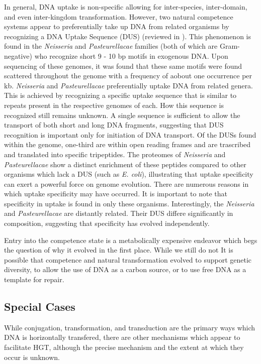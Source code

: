 In general, DNA uptake is non-specific allowing for inter-species, inter-domain,
and even inter-kingdom transformation. However, two natural competence systems
appear to preferentially take up DNA from related organisms by recognizing a DNA
Uptake Sequence (DUS) (reviewed in \citet{Mell:2014dj}). This phenomenon is
found in the \textit{Neisseria} and \textit{Pasteurellacae} families (both of
which are Gram-negative) who recognize short 9 - 10 bp motifs in exogenous DNA.
Upon sequencing of these genomes, it was found that these same motifs were found
scattered throughout the genome with a frequency of aobout one occurrence per
kb.  \textit{Neisseria} and \textit{Pasteurellacae} preferentially uptake DNA
from related genera. This is achieved by recognizing a specific uptake sequence
that is similar to repeats present in the respective genomes of each. How this
sequence is recognized still remains unknown. A single sequence is sufficient to
allow the transport of both short and long DNA fragments, suggesting that DUS
recognition is important only for initiation of DNA transport. Of the DUSs found
within the genome, one-third are within open reading frames and are trascribed
and translated into specific tripeptides. The proteomes of \textit{Neisseria}
and \textit{Pasteurellacae} show a distinct enrichment of these peptides
compared to other organisms which lack a DUS (such as \textit{E. coli}),
illustrating that uptake specificity can exert a powerful force on genome
evolution. There are numerous reasons in which uptake specificity may have
occurred. It is important to note that specificity in uptake is found in only
these organisms. Interestingly, the \textit{Neisseria} and
\textit{Pasteurellacae} are distantly related. Their DUS differe significantly
in composition, suggesting that specificity has evolved independently.


Entry into the competence state is a metabolically expensive endeavor which begs
the question of why it evolved in the first place. While we still do not 
It is possible that competence and natural transformation evolved to support
genetic diversity\cite{Barton:1998uq, Otto:2006vm}, to allow the use of DNA as a
carbon source\cite{Dubnau:199vq, Redfield:2001vx}, or to use free DNA as a
template for repair\cite{Claverys:2006do, Dorer:2010tf}.
\subsection*{Special Cases}
While conjugation, transformation, and transduction are the primary ways which
DNA is horizontally transfered, there are other mechanisms which appear to
facilitate HGT, although the precise mechanism and the extent at which they
occur is unknown.

